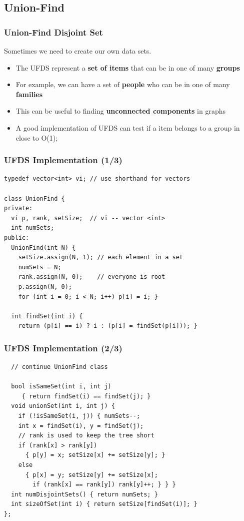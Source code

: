 \documentclass{beamer}
\begin{document}
\subsection{Union-Find}
\begin{frame}
  \frametitle{Union-Find Disjoint Set}

  \begin{block}{}
    Sometimes we need to create our own data sets.
  \end{block}

  \bigskip

  \begin{itemize}
  \item The UFDS represent a {\bf set of items} that can be in one of many {\bf groups}

    \bigskip
    
  \item For example, we can have a set of {\bf people} who can be in one of many {\bf families}

    \bigskip

  \item This can be useful to finding {\bf unconnected components} in graphs

    \bigskip

  \item A good implementation of UFDS can test if a item belongs to a group in close to O(1);    
  \end{itemize}
\end{frame}

\begin{frame}[fragile]
  \frametitle{UFDS Implementation (1/3) }

  {\small
\begin{verbatim}
typedef vector<int> vi; // use shorthand for vectors

class UnionFind { 
private: 
  vi p, rank, setSize;  // vi -- vector <int>
  int numSets;
public:
  UnionFind(int N) {
    setSize.assign(N, 1); // each element in a set 
    numSets = N; 
    rank.assign(N, 0);    // everyone is root
    p.assign(N, 0); 
    for (int i = 0; i < N; i++) p[i] = i; }

  int findSet(int i) { 
    return (p[i] == i) ? i : (p[i] = findSet(p[i])); }
\end{verbatim}
  }
\end{frame}
\begin{frame}[fragile]
  \frametitle{UFDS Implementation (2/3)}

  {\small
\begin{verbatim}             
  // continue UnionFind class

  bool isSameSet(int i, int j) 
     { return findSet(i) == findSet(j); }
  void unionSet(int i, int j) { 
    if (!isSameSet(i, j)) { numSets--; 
    int x = findSet(i), y = findSet(j);
    // rank is used to keep the tree short
    if (rank[x] > rank[y]) 
      { p[y] = x; setSize[x] += setSize[y]; }
    else                   
      { p[x] = y; setSize[y] += setSize[x];
        if (rank[x] == rank[y]) rank[y]++; } } }
  int numDisjointSets() { return numSets; }
  int sizeOfSet(int i) { return setSize[findSet(i)]; }
};
\end{verbatim}}
\end{frame}
\end{document}
